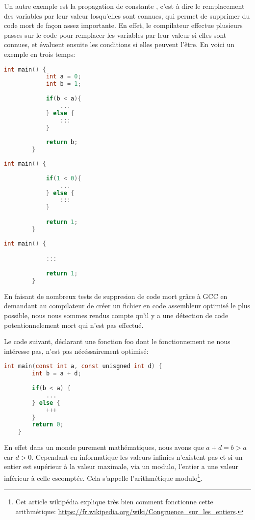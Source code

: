 Un autre exemple est la propagation de constante \cite{compilateurs}, c'est à dire le remplacement des variables par leur valeur losqu'elles sont connues, qui permet de supprimer du code mort de façon assez importante. En effet, le compilateur effectue plusieurs passes sur le code pour remplacer les variables par leur valeur si elles sont connues, et évaluent ensuite les conditions si elles peuvent l'être.
\newpage
En voici un exemple en trois temps:
\begin{multicols}{3}
    \begin{lstlisting}[language=c]
        int main() {
            int a = 0;
            int b = 1;
            
            if(b < a){
                ...
            } else {
                :::
            }
        
            return b;
        }
    \end{lstlisting}
    \columnbreak
    \begin{lstlisting}[language=c]
        int main() {
            
            if(1 < 0){
                ...
            } else {
                :::
            }
        
            return 1;
        }
    \end{lstlisting}
    \columnbreak
    \begin{lstlisting}[language=c]
        int main() {

            :::
        
            return 1;
        }
    \end{lstlisting}
\end{multicols}
\begin{center}
\end{center}
En faisant de nombreux tests de suppresion de code mort grâce à GCC en demandant au compilateur de créer un fichier en code assembleur optimisé le plus possible, nous nous sommes rendus compte qu'il y a une détection de code \og potentionnelement mort \fg{} qui n'est pas effectué.

Le code suivant, déclarant une fonction foo dont le fonctionnement ne nous intéresse pas, n'est pas nécéssairement optimisé:
\begin{lstlisting}[language=c, xleftmargin=.2\textwidth, caption={Exemple de programme avec du code potentiellement mort}, captionpos=b]
    int main(const int a, const unisgned int d) {
        int b = a + d;
        
        if(b < a) {
            ...
        } else {
            +++
        }
        return 0;
    }
\end{lstlisting}
En effet dans un monde purement mathématiques, nous avons que $a + d = b > a$ car $d > 0$. Cependant en informatique les valeurs infinies n'existent pas et si un entier est supérieur à la valeur maximale, via un modulo, l'entier a une valeur inférieur à celle escomptée. Cela s'appelle \og l'arithmétique modulo\footnote{Cet article wikipédia explique très bien comment fonctionne cette arithmétique: \url{https://fr.wikipedia.org/wiki/Congruence_sur_les_entiers}.}\fg{}.

